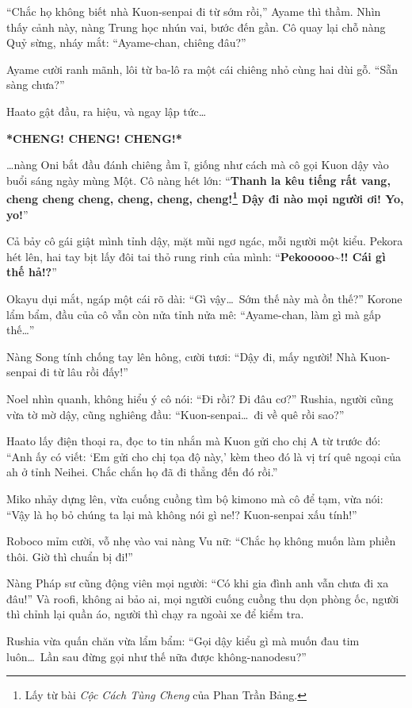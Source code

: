 \documentclass[../main.tex]{subfiles}
\begin{document}
``Chắc họ không biết nhà Kuon-senpai đi từ sớm rồi,'' Ayame thì thầm. Nhìn thấy cảnh này, nàng Trung học nhún vai, bước đến gần. Cô quay lại chỗ nàng Quỷ sừng, nháy mắt: ``Ayame-chan, chiêng đâu?''

Ayame cười ranh mãnh, lôi từ ba-lô ra một cái chiêng nhỏ cùng hai dùi gỗ. ``Sẵn sàng chưa?''

Haato gật đầu, ra hiệu, và ngay lập tức\dots

\textbf{*CHENG! CHENG! CHENG!*}

\dots nàng Oni bắt đầu đánh chiêng ầm ĩ, giống như cách mà cô gọi Kuon dậy vào buổi sáng ngày mùng Một. Cô nàng hét lớn: ``\textbf{Thanh la kêu tiếng rất vang, cheng cheng cheng, cheng, cheng, cheng!\footnote{Lấy từ bài \textit{Cộc Cách Tùng Cheng} của Phan Trần Bảng.} Dậy đi nào mọi người ơi! Yo, yo!}''

Cả bảy cô gái giật mình tỉnh dậy, mặt mũi ngơ ngác, mỗi người một kiểu. Pekora hét lên, hai tay bịt lấy đôi tai thỏ rung rinh của mình: ``\textbf{Pekooooo\~{}!! Cái gì thế hả!?}''

Okayu dụi mắt, ngáp một cái rõ dài: ``Gì vậy\dots\ Sớm thế này mà ồn thế?'' Korone lẩm bẩm, đầu của cô vẫn còn nửa tỉnh nửa mê: ``Ayame-chan, làm gì mà gấp thế\dots''

Nàng Song tính chống tay lên hông, cười tươi: ``Dậy đi, mấy người! Nhà Kuon-senpai đi từ lâu rồi đấy!''

Noel nhìn quanh, không hiểu ý cô nói: ``Đi rồi? Đi đâu cơ?'' Rushia, người cũng vừa tờ mờ dậy, cũng nghiêng đầu: ``Kuon-senpai\dots\ đi về quê rồi sao?''

Haato lấy điện thoại ra, đọc to tin nhắn mà Kuon gửi cho chị A từ trước đó: ``Anh ấy có viết: `Em gửi cho chị tọa độ này,' kèm theo đó là vị trí quê ngoại của ah ở tỉnh Neihei. Chắc chắn họ đã đi thẳng đến đó rồi.''

Miko nhảy dựng lên, vừa cuống cuồng tìm bộ kimono mà cô để tạm, vừa nói: ``Vậy là họ bỏ chúng ta lại mà không nói gì ne!? Kuon-senpai xấu tính!''

Roboco mỉm cười, vỗ nhẹ vào vai nàng Vu nữ: ``Chắc họ không muốn làm phiền thôi. Giờ thì chuẩn bị đi!''

Nàng Pháp sư cũng động viên mọi người: ``Có khi gia đình anh vẫn chưa đi xa đâu!'' Và roofi, không ai bảo ai, mọi người cuống cuồng thu dọn phòng ốc, người thì chỉnh lại quần áo, người thì chạy ra ngoài xe để kiểm tra.

Rushia vừa quấn chăn vừa lẩm bẩm: ``Gọi dậy kiểu gì mà muốn đau tim luôn\dots\ Lần sau đừng gọi như thế nữa được không-nanodesu?''
\end{document}
